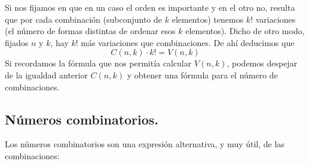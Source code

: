 Si nos fijamos en que en un caso el orden es importante y en el otro no, resulta que por cada combinaci\'on (subconjunto de $k$ elementos) tenemos $k!$ variaciones (el n\'umero de formas distintas de ordenar esos $k$ elementos). Dicho de otro modo, fijados $n$ y $k$, hay $k!$ más variaciones que combinaciones. De ahí deducimos que
\[C(n,k)\cdot k! = V(n,k)\]
Si recordamos la fórmula que nos permitía calcular $V(n,k)$, podemos despejar
de la igualdad anterior $C(n,k)$ y obtener una fórmula para el número de combinaciones.
    \begin{center}
    \end{center}

\subsection{Números combinatorios.}
\label{cap03:subsec:NumerosCombinatorios}

Los números combinatorios son una expresión alternativa, y muy útil, de las combinaciones:
    \begin{center}
    \end{center}
%




